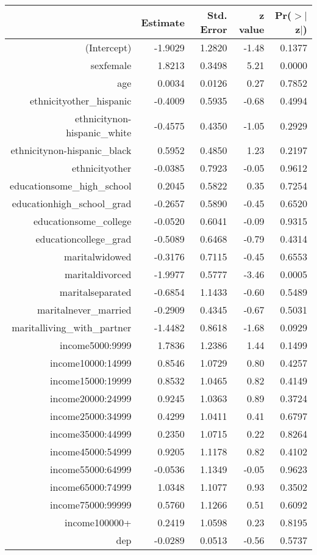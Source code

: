\begin{table}[ht]
\centering
\begin{tabular}{rrrrr}
  \hline
 & Estimate & Std. Error & z value & Pr($>$$|$z$|$) \\ 
  \hline
(Intercept) & -1.9029 & 1.2820 & -1.48 & 0.1377 \\ 
  sexfemale & 1.8213 & 0.3498 & 5.21 & 0.0000 \\ 
  age & 0.0034 & 0.0126 & 0.27 & 0.7852 \\ 
  ethnicityother\_hispanic & -0.4009 & 0.5935 & -0.68 & 0.4994 \\ 
  ethnicitynon-hispanic\_white & -0.4575 & 0.4350 & -1.05 & 0.2929 \\ 
  ethnicitynon-hispanic\_black & 0.5952 & 0.4850 & 1.23 & 0.2197 \\ 
  ethnicityother & -0.0385 & 0.7923 & -0.05 & 0.9612 \\ 
  educationsome\_high\_school & 0.2045 & 0.5822 & 0.35 & 0.7254 \\ 
  educationhigh\_school\_grad & -0.2657 & 0.5890 & -0.45 & 0.6520 \\ 
  educationsome\_college & -0.0520 & 0.6041 & -0.09 & 0.9315 \\ 
  educationcollege\_grad & -0.5089 & 0.6468 & -0.79 & 0.4314 \\ 
  maritalwidowed & -0.3176 & 0.7115 & -0.45 & 0.6553 \\ 
  maritaldivorced & -1.9977 & 0.5777 & -3.46 & 0.0005 \\ 
  maritalseparated & -0.6854 & 1.1433 & -0.60 & 0.5489 \\ 
  maritalnever\_married & -0.2909 & 0.4345 & -0.67 & 0.5031 \\ 
  maritalliving\_with\_partner & -1.4482 & 0.8618 & -1.68 & 0.0929 \\ 
  income5000:9999 & 1.7836 & 1.2386 & 1.44 & 0.1499 \\ 
  income10000:14999 & 0.8546 & 1.0729 & 0.80 & 0.4257 \\ 
  income15000:19999 & 0.8532 & 1.0465 & 0.82 & 0.4149 \\ 
  income20000:24999 & 0.9245 & 1.0363 & 0.89 & 0.3724 \\ 
  income25000:34999 & 0.4299 & 1.0411 & 0.41 & 0.6797 \\ 
  income35000:44999 & 0.2350 & 1.0715 & 0.22 & 0.8264 \\ 
  income45000:54999 & 0.9205 & 1.1178 & 0.82 & 0.4102 \\ 
  income55000:64999 & -0.0536 & 1.1349 & -0.05 & 0.9623 \\ 
  income65000:74999 & 1.0348 & 1.1077 & 0.93 & 0.3502 \\ 
  income75000:99999 & 0.5760 & 1.1266 & 0.51 & 0.6092 \\ 
  income100000+ & 0.2419 & 1.0598 & 0.23 & 0.8195 \\ 
  dep & -0.0289 & 0.0513 & -0.56 & 0.5737 \\ 
   \hline
\end{tabular}
\end{table}
